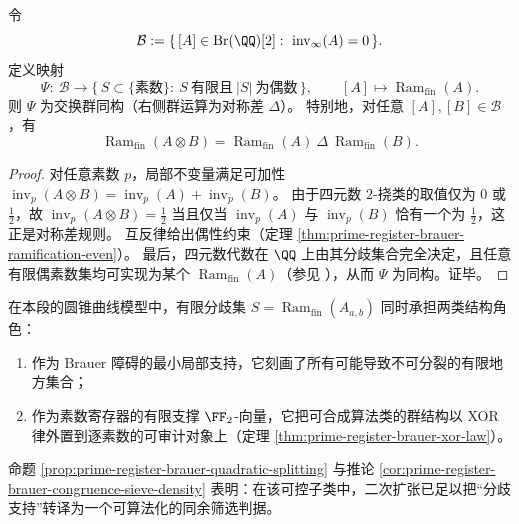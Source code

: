 \begin{theorem}\label{thm:prime-register-brauer-xor-law}
令
\[
\mathcal{B}:=\{\, [A]\in \mathrm{Br}(\QQ)[2]:\ \operatorname{inv}_\infty(A)=0\,\}.
\]
定义映射
\[
\Psi:\ \mathcal{B}\longrightarrow \{\,S\subset \{\text{素数}\}:\ S\ \text{有限且}\ |S|\ \text{为偶数}\,\},
\qquad
[A]\longmapsto \operatorname{Ram}_{\mathrm{fin}}(A).
\]
则 \(\Psi\) 为交换群同构（右侧群运算为对称差 \(\Delta\)）。
特别地，对任意 \([A],[B]\in\mathcal{B}\)，有
\[
\operatorname{Ram}_{\mathrm{fin}}(A\otimes B)
=\operatorname{Ram}_{\mathrm{fin}}(A)\ \Delta\ \operatorname{Ram}_{\mathrm{fin}}(B).
\]
\end{theorem}
\begin{proof}
对任意素数 \(p\)，局部不变量满足可加性
\(
\operatorname{inv}_p(A\otimes B)=\operatorname{inv}_p(A)+\operatorname{inv}_p(B)
\)。
由于四元数 \(2\)-挠类的取值仅为 \(0\) 或 \(\tfrac12\)，故
\(
\operatorname{inv}_p(A\otimes B)=\tfrac12
\)
当且仅当 \(\operatorname{inv}_p(A)\) 与 \(\operatorname{inv}_p(B)\) 恰有一个为 \(\tfrac12\)，这正是对称差规则。
互反律给出偶性约束（定理 \ref{thm:prime-register-brauer-ramification-even}）。
最后，四元数代数在 \(\QQ\) 上由其分歧集合完全决定，且任意有限偶素数集均可实现为某个 \(\operatorname{Ram}_{\mathrm{fin}}(A)\)（参见 \cite{VoightQuaternionAlgebras}），从而 \(\Psi\) 为同构。证毕。
\end{proof}

\begin{remark}[外置素数支持的最小性口径]\label{rem:prime-register-brauer-minimal-support}
在本段的圆锥曲线模型中，有限分歧集 \(S=\operatorname{Ram}_{\mathrm{fin}}(A_{a,b})\) 同时承担两类结构角色：
\begin{enumerate}
  \item 作为 Brauer 障碍的最小局部支持，它刻画了所有可能导致不可分裂的有限地方集合；
  \item 作为素数寄存器的有限支撑 \(\FF_2\)-向量，它把可合成算法类的群结构以 XOR 律外置到逐素数的可审计对象上（定理 \ref{thm:prime-register-brauer-xor-law}）。
\end{enumerate}
命题 \ref{prop:prime-register-brauer-quadratic-splitting} 与推论 \ref{cor:prime-register-brauer-congruence-sieve-density} 表明：在该可控子类中，二次扩张已足以把“分歧支持”转译为一个可算法化的同余筛选判据。
\end{remark}
